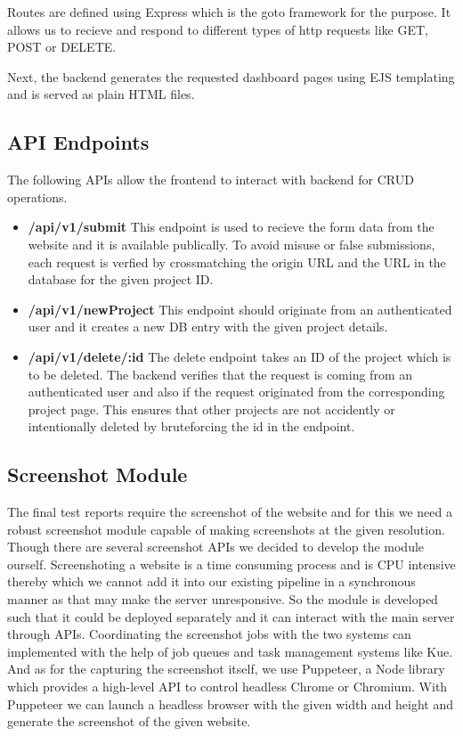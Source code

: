 \documentclass[hidelinks,12pt,a4paper,final]{extreport}
\begin{document}
Routes are defined using Express which is the goto framework for the purpose. It allows us to recieve and respond to different types of http requests like GET, POST or DELETE. 

Next, the backend generates the requested dashboard pages using EJS templating and is served as plain HTML files.

\subsection{API Endpoints}
The following APIs allow the frontend to interact with backend for CRUD operations.
\begin{itemize}
    \item \textbf{/api/v1/submit} This endpoint is used to recieve the form data from the website and it is available publically. To avoid misuse or false submissions, each request is verfied by crossmatching the origin URL and the URL in the database for the given project ID.
    \item \textbf{/api/v1/newProject} This endpoint should originate from an authenticated user and it creates a new DB entry with the given project details.
    \item \textbf{/api/v1/delete/:id} The delete endpoint takes an ID of the project which is to be deleted. The backend verifies that the request is coming from an authenticated user and also if the request originated from the corresponding project page. This ensures that other projects are not accidently or intentionally deleted by bruteforcing the id in the endpoint.
\end{itemize}
\subsection{Screenshot Module}
The final test reports require the screenshot of the website and for this we need a robust screenshot module capable of making screenshots at the given resolution. Though there are several screenshot APIs we decided to develop the module ourself. Screenshoting a website is a time consuming process and is CPU intensive thereby which we cannot add it into our existing pipeline in a synchronous manner as that may make the server unresponsive. So the module is developed such that it could be deployed separately and it can interact with the main server through APIs. Coordinating the screenshot jobs with the two systems can implemented with the help of job queues and task management systems like Kue. And as for the capturing the screenshot itself, we use Puppeteer, a Node library which provides a high-level API to control headless Chrome or Chromium. With Puppeteer we can launch a headless browser with the given width and height and generate the screenshot of the given website.
\end{document}
